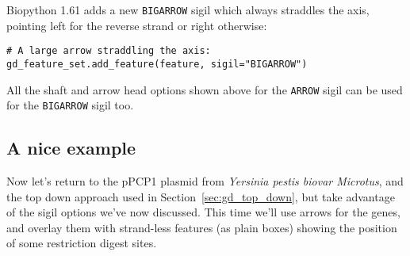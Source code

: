 Biopython 1.61 adds a new \verb|BIGARROW| sigil which always straddles
the axis, pointing left for the reverse strand or right otherwise:

\begin{verbatim}
# A large arrow straddling the axis:
gd_feature_set.add_feature(feature, sigil="BIGARROW")
\end{verbatim}

\noindent All the shaft and arrow head options shown above for the
\verb|ARROW| sigil can be used for the \verb|BIGARROW| sigil too.

\subsection{A nice example}
\label{sec:gd_nice_example}

Now let's return to the pPCP1 plasmid from \textit{Yersinia pestis biovar
Microtus}, and the top down approach used in Section~\ref{sec:gd_top_down},
but take advantage of the sigil options we've now discussed.  This time
we'll use arrows for the genes, and overlay them with strand-less features
(as plain boxes) showing the position of some restriction digest sites.

